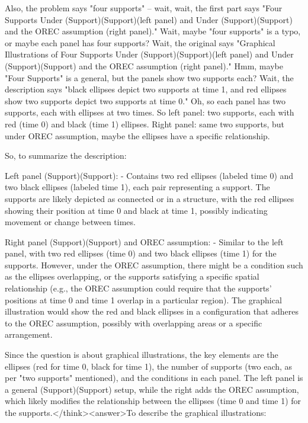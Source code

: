 Also, the problem says "four supports" – wait, wait, the first part says "Four Supports Under (Support)(Support)(left panel) and Under (Support)(Support) and the OREC assumption (right panel)." Wait, maybe "four supports" is a typo, or maybe each panel has four supports? Wait, the original says "Graphical Illustrations of Four Supports Under (Support)(Support)(left panel) and Under (Support)(Support) and the OREC assumption (right panel)." Hmm, maybe "Four Supports" is a general, but the panels show two supports each? Wait, the description says "black ellipses depict two supports at time 1, and red ellipses show two supports depict two supports at time 0." Oh, so each panel has two supports, each with ellipses at two times. So left panel: two supports, each with red (time 0) and black (time 1) ellipses. Right panel: same two supports, but under OREC assumption, maybe the ellipses have a specific relationship. 

So, to summarize the description:

Left panel (Support)(Support):
- Contains two red ellipses (labeled time 0) and two black ellipses (labeled time 1), each pair representing a support. The supports are likely depicted as connected or in a structure, with the red ellipses showing their position at time 0 and black at time 1, possibly indicating movement or change between times.

Right panel (Support)(Support) and OREC assumption:
- Similar to the left panel, with two red ellipses (time 0) and two black ellipses (time 1) for the supports. However, under the OREC assumption, there might be a condition such as the ellipses overlapping, or the supports satisfying a specific spatial relationship (e.g., the OREC assumption could require that the supports' positions at time 0 and time 1 overlap in a particular region). The graphical illustration would show the red and black ellipses in a configuration that adheres to the OREC assumption, possibly with overlapping areas or a specific arrangement.

Since the question is about graphical illustrations, the key elements are the ellipses (red for time 0, black for time 1), the number of supports (two each, as per "two supports" mentioned), and the conditions in each panel. The left panel is a general (Support)(Support) setup, while the right adds the OREC assumption, which likely modifies the relationship between the ellipses (time 0 and time 1) for the supports.</think><answer>To describe the graphical illustrations:  

